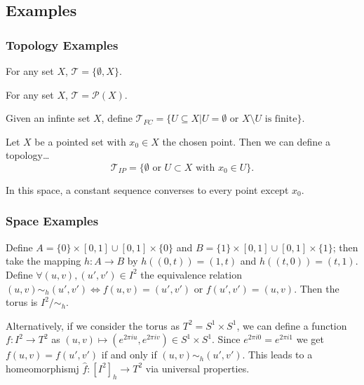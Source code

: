 \subsection{Examples}

\subsubsection{Topology Examples}\label{exampletopologies}

\label{indiscretetopology}

For any set $X$, $\mathcal{T} = \{\emptyset, X\}$.

\label{discretetopology}

For any set $X$, $\mathcal{T} = \mathcal{P}(X)$.

\label{finitecomplementtopology}

Given an infinte set $X$, define $\mathcal{T}_{FC} = \{U \subseteq X | U = \emptyset \textrm{ or } X \setminus U \textrm{ is finite}\}$.

\label{includedpointtopology}
Let $X$ be a pointed set with $x_0 \in X$ the chosen point. Then we can define a topology\dots
$$\mathcal{T}_{IP} = \{ \emptyset \textrm{ or } U \subset X \textrm{ with } x_0 \in U \}.$$

\noindent In this space, a constant sequence converses to every point except $x_0$.

\subsubsection{Space Examples}\label{examplespaces}

\label{torus}
Define $A = \{ 0 \} \times [0,1] \cup [0,1] \times \{ 0 \}$ and $B = \{ 1 \} \times [0,1] \cup [0,1] \times \{ 1 \}$; then take the mapping
$h : A \rightarrow B$ by $h((0,t)) = (1,t)$ and $h((t,0)) = (t,1)$. Define $\forall (u,v),(u',v') \in I^2$ the equivalence relation
$(u,v) \sim_h (u',v') \Leftrightarrow f(u,v) = (u',v') \textrm { or } f(u',v') = (u,v).$ Then the torus is $I^2 / \sim_h$. \newline

\noindent Alternatively, if we consider the torus as $T^2 = S^1 \times S^1$, we can define a function $f : I^2 \rightarrow T^2$ as
$(u,v) \mapsto (e^{2 \pi i u}, e^{2 \pi i v}) \in S^1 \times S^1$. Since $e^{2 \pi i 0} = e^{2 \pi i 1}$ we get $f(u,v) = f(u',v')$ if and only
if $(u,v) \sim_h (u',v')$. This leads to a homeomorphismj $\hat{f} : [I^2]_h \rightarrow T^2$ via universal properties.

